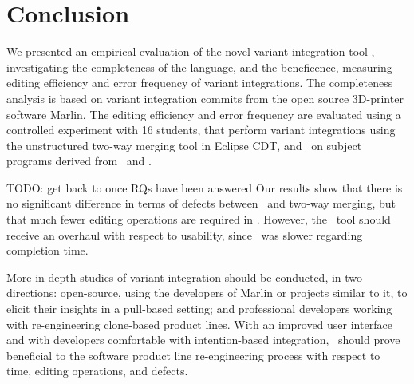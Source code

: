 \chapter{Conclusion}
We presented an empirical evaluation of the novel variant integration tool \tooln, investigating the completeness of the language, and the beneficence, measuring editing efficiency and error frequency of variant integrations. The completeness analysis is based on variant integration commits from the open source 3D-printer software Marlin. The editing efficiency and error frequency are evaluated using a controlled experiment with 16 students, that perform variant integrations using the unstructured two-way merging tool in Eclipse CDT, and \tooln~on subject programs derived from \busybox~and \vim. 

TODO: get back to once RQs have been answered
Our results show that there is no significant difference in terms of defects between \tooln~and two-way merging, but that much fewer editing operations are required in \tooln. However, the \tooln~tool should receive an overhaul with respect to usability, since \tooln~was slower regarding completion time.

More in-depth studies of variant integration should be conducted, in two directions: open-source, using the developers of Marlin or projects similar to it, to elicit their insights in a pull-based setting; and professional developers working with re-engineering clone-based product lines.
With an improved user interface and with developers comfortable with intention-based integration, \tooln~should prove beneficial to the software product line re-engineering process with respect to time, editing operations, and defects.



